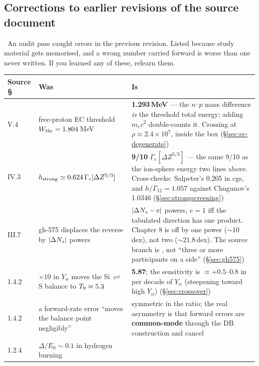\subsection{Corrections to earlier revisions of the source document}
\label{sec:errata}

\begin{warn}
\warnglyph{}~An audit pass caught errors in the previous revision. Listed
because study material gets memorised, and a wrong number carried forward is
worse than one never written. If you learned any of these, relearn them.
\end{warn}

\begin{center}
\begin{tabularx}{\textwidth}{@{}L{1.6cm} L{4.6cm} Y@{}}
\toprule
\textbf{Source \S} & \textbf{Was} & \textbf{Is} \\
\midrule
V.4 & free-proton EC threshold $W_{\rm thr} = 1.804$\,MeV &
  \textbf{1.293\,MeV} --- the $n$--$p$ mass difference \emph{is} the threshold
  total energy; adding $m_ec^2$ double-counts it. Crossing at
  $\rho \approx 2.4\times10^7$, inside the box (\S\ref{sec:ec-degenerate}) \\
IV.3 & $h_{\rm strong} \simeq 0.624\,\Gamma_e[\Delta Z^{5/3}]$ &
  \textbf{9/10} $\Gamma_e[\Delta Z^{5/3}]$ --- the same 9/10 as the ion-sphere
  energy two lines above. Cross-checks: Salpeter's 0.205 in cgs, and
  $h/\Gamma_{12} = 1.057$ against Chugunov's 1.0346
  (\S\ref{sec:strongscreening}) \\
III.7 & gh-575 displaces the reverse by $|\Delta N_{s}|$ powers &
  \textbf{$|\Delta N_{s} - e|$} powers, $e = 1$ iff the tabulated direction has one
  product. Chapter 8 is off by one power (${\sim}10$\,dex), not two
  (${\sim}21.8$\,dex). The source branch is , not ``three or more
  participants on a side'' (\S\ref{sec:gh575}) \\
1.4.2 & ${\times}10$ in $Y_\alpha$ moves the Si\,$\rightleftharpoons$\,S balance
  to $T_{9} \approx 5.3$ &
  \textbf{5.87}; the sensitivity is $\approx +0.5$--0.8 in \Tn{} per decade of
  $Y_\alpha$ (steepening toward high $Y_\alpha$) (\S\ref{sec:crossover}) \\
1.4.2 & a forward-rate error ``moves the balance point negligibly'' &
  symmetric in the ratio; the real asymmetry is that forward errors are
  \textbf{common-mode} through the DB construction and cancel \\
1.2.4 & $\Delta/E_0 \sim 0.1$ in hydrogen burning &

\end{tabularx}
\end{center}

